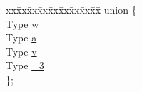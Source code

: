 \begin{DoxyCompactItemize}
\begin{tabbing}
\end{tabbing}\item 
\begin{tabbing}
xx\=xx\=xx\=xx\=xx\=xx\=xx\=xx\=xx\=\kill
union \{\\
\>Type \hyperlink{class__vertex4_aedc561486a2aa5aded4b2b931b3aa905}{w}\\
\>Type \hyperlink{class__vertex4_abf7dc914b992f38df50edbcf9e1be42f}{a}\\
\>Type \hyperlink{class__vertex4_aa482b2b78ee03de722c171502ddbff4f}{v}\\
\>Type \hyperlink{class__vertex4_af89b099cc7a2a66fc4db9b3cd5c1dcfb}{\_3}\\
\}; \\

\end{tabbing}\end{DoxyCompactItemize}


